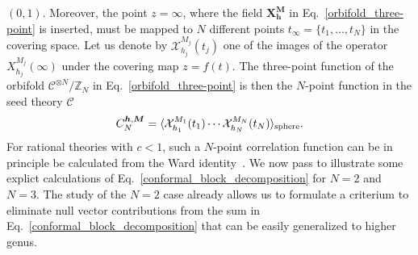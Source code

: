 \documentclass[a4paper,11pt]{article}
\begin{document}
$(0,1)$. Moreover, the point $z=\infty$, where the field $\boldsymbol{X}_{\boldsymbol{h}}^{\boldsymbol{M}}$ in Eq.~\eqref{orbifold_three-point} is inserted,
must be mapped to $N$ different points $t_\infty=\{t_1, \dots, t_N\}$ in 
the covering space. Let us denote by $\mathcal{X}_{h_j}^{M_j}(t_j)$ one of the images
of the operator $X_{h_j}^{M_j}(\infty)$ under the covering map $z=f(t)$. The three-point 
function of the orbifold $\mathcal{C}^{\otimes N}/\mathbb{Z}_N$ 
in Eq.~\eqref{orbifold_three-point} is then the $N$-point function in the seed theory $\mathcal{C}$
\begin{equation}\label{N-point}
 C_N^{\boldsymbol{h},\boldsymbol{M}}=\langle \mathcal{X}^{M_1}_{h_1}(t_1)\cdots\mathcal{X}_{h_N}^{M_N}(t_N)\rangle_{\rm{sphere}}.
\end{equation}
For rational theories with $c<1$, such a $N$-point correlation function can be in principle be calculated from the Ward identity~\cite{BPZ}. 
We now pass to illustrate some explict calculations of Eq.~\eqref{conformal_block_decomposition} for $N=2$ and $N=3$. The study of the $N=2$ case already allows us to formulate a criterium to eliminate null vector contributions from the sum in Eq.~\eqref{conformal_block_decomposition} that can be easily generalized to  higher genus.
\end{document}
